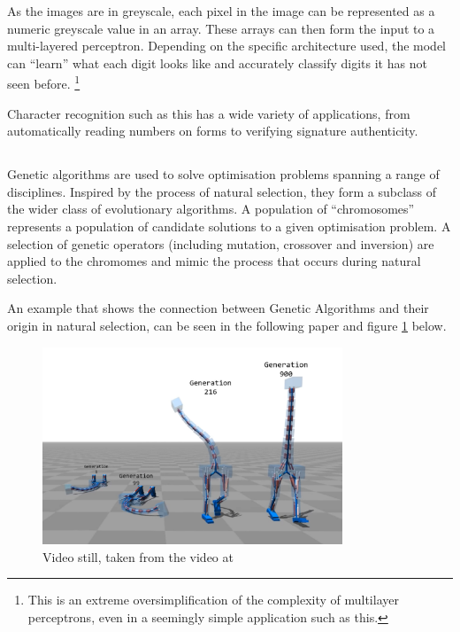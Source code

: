 \documentclass[a4paper]{report}
\begin{document}
As the images are in greyscale, each pixel in the image can be represented as a numeric greyscale value in an array. These arrays can then form the input to a multi-layered perceptron. Depending on the specific architecture used, the model can ``learn'' what each digit looks like and accurately classify digits it has not seen before. \footnote{This is an extreme oversimplification of the complexity of multilayer perceptrons, even in a seemingly simple application such as this.}

Character recognition such as this has a wide variety of applications, from automatically reading numbers on forms to verifying signature authenticity.

\subsection{}
Genetic algorithms are used to solve optimisation problems spanning a range of disciplines. Inspired by the process of natural selection, they form a subclass of the wider class of evolutionary algorithms. A population of ``chromosomes'' represents a population of candidate solutions to a given optimisation problem. A selection of genetic operators (including mutation, crossover and inversion) are applied to the chromomes and mimic the process that occurs during natural selection.

An example that shows the connection between Genetic Algorithms and their origin in natural selection, can be seen in the following paper \cite{twoLegs} and figure \ref{fig:twoLegsWalk} below.

\begin{figure}[H]
    \centering
    \includegraphics[width=0.8\textwidth]{images/walking.png}
    \caption{Video still, taken from the video at \cite{twoLegsVid}}
    \label{fig:twoLegsWalk}
\end{figure}
\end{document}
